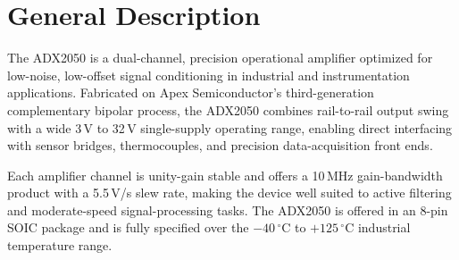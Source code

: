 \section{General Description}
The ADX2050 is a dual-channel, precision operational amplifier optimized for
low-noise, low-offset signal conditioning in industrial and instrumentation
applications. Fabricated on Apex Semiconductor's third-generation complementary
bipolar process, the ADX2050 combines rail-to-rail output swing with a wide
3\,V to 32\,V single-supply operating range, enabling direct interfacing with
sensor bridges, thermocouples, and precision data-acquisition front ends.

\medskip
Each amplifier channel is unity-gain stable and offers a 10\,MHz
gain-bandwidth product with a 5.5\,V/\textmu s slew rate, making the device
well suited to active filtering and moderate-speed signal-processing tasks.
The ADX2050 is offered in an 8-pin SOIC package and is fully specified over
the $-40\,^{\circ}$C to $+125\,^{\circ}$C industrial temperature range.

